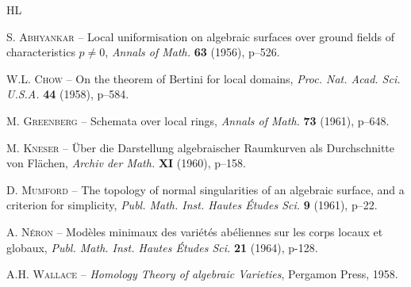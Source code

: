 \begin{thebibliography}{HL}\pageoriginale\label{XIII.7}

 
{%
\textsc{S. Abhyankar} -- {\og Local uniformisation on algebraic surfaces over ground fields of characteristics $p\neq0$\fg}, \emph{Annals of Math.} \textbf{63} (1956), p--526.
}

 
{%
\textsc{W.L. Chow} -- {\og On the theorem of Bertini for local domains\fg}, \emph{Proc. Nat. Acad. Sci. U.S.A.} \textbf{44} (1958), p--584.
}

 
{%
\textsc{M. Greenberg} -- {\og Schemata over local rings\fg}, \emph{Annals of Math.} \textbf{73} (1961), p--648.
}

 
{%
\textsc{M. Kneser} -- {\og \"Uber die Darstellung algebraischer Raumkurven als Durchschnitte von Fl\"achen\fg}, \emph{Archiv der Math.} \textbf{XI} (1960), p--158.
}

 
{%
\textsc{D. Mumford} -- {\og The topology of normal singularities of an algebraic surface, and a criterion for simplicity\fg}, \emph{Publ. Math. Inst. Hautes \'Etudes Sci.} \textbf{9} (1961), p--22.
}

 
{%
\textsc{A. N\'eron} -- {\og Mod\`eles minimaux des vari\'et\'es ab\'eliennes sur les corps locaux et globaux\fg}, \emph{Publ. Math. Inst. Hautes \'Etudes Sci.} \textbf{21} (1964), p-128.
}

 
{%
\textsc{A.H. Wallace} -- \emph{Homology Theory of algebraic Varieties}, Pergamon Press, 1958.
}


\end{thebibliography}
